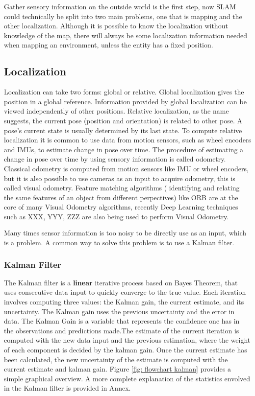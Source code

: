 Gather sensory information on the outside world is the first step, now \acs*{SLAM} could technically be split into two main problems, one that is mapping and the other localization. Although it is possible to know the localization without knowledge of the map, there will always be some localization information needed when mapping an environment, unless the entity has a fixed position.

\subsection{Localization}
Localization can take two forms: global or relative. Global localization gives the position in a global reference. Information provided by global localization can be viewed independently of other positions.
Relative localization, as the name suggests, the current pose (position and orientation) is related to other pose. A pose's current state is usually determined by its last state. To compute relative localization it is common to use data from motion sensors, such as wheel encoders and \acs*{IMU}s, to estimate change in pose over time.
The procedure of estimating a change in pose over time by using sensory information is called odometry. Classical odometry is computed from motion sensors like \acs*{IMU} or wheel encoders, but it is also possible to use cameras as an input to acquire odometry, this is called visual odometry. Feature matching algorithms ( identifying and relating the same features of an object from different perpectives) like ORB \cite{rublee_orb_2011} are at the core of many Visual Odometry algorithms, recently Deep Learning techniques such as XXX, YYY, ZZZ are also being used to perform Visual Odometry.

Many times sensor information is too noisy to be directly use as an input, which is a problem. A common way to solve this problem is to use a Kalman filter.

\subsubsection{Kalman Filter}
The Kalman filter is a \textbf{linear} iterative process based on Bayes Theorem, that uses consecutive data input to quickly converge to the true value. Each iteration involves computing three values: the Kalman gain, the current estimate, and its uncertainty. The Kalman gain uses the previous uncertainty and the error in data. The Kalman Gain is a variable that represents the confidence one has in the observations and predictions made.The estimate of the current iteration is computed with the new data input and the previous estimation, where the weight of each component is decided by the kalman gain. Once the current estimate has been calculated, the new uncertainty of the estimate is computed with the current estimate and kalman gain. Figure \ref*{fig: flowchart kalman} provides a simple graphical overview. A more complete explanation of the statistics envolved in the Kalman filter is provided in Annex. 

